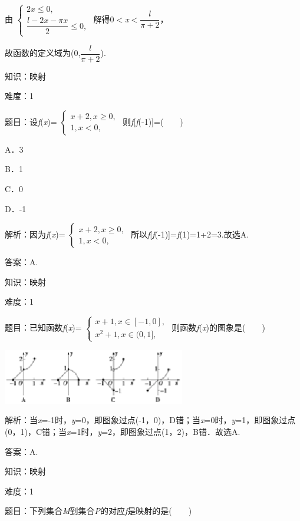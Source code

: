 \documentclass{article} %
\begin{document}
由
$\left\{
\begin{array}{l}
	2x\le 0,\\
	\dfrac{l-2x-\pi x}{2} \le 0,
\end{array}
\right.$
解得0$\mathrm{<}$\textit{x}$\mathrm{<}$$\dfrac{l}{\pi+2}$，

故函数的定义域为(0,$\dfrac{l}{\pi+2}$).

知识：映射

难度：1

题目：设\textit{f}(\textit{x})=
$\left\{
\begin{array}{l}
	x+2, x\ge 0,\\
	1, x< 0,
\end{array}
\right.$
则\textit{f}[\textit{f}(-1)]=(　　)

A．3　　　　

B．1　　　　

C．0　　　　

D．-1

解析：因为\textit{f}(\textit{x})=
$\left\{
\begin{array}{l}
x+2, x\ge 0,\\
1, x< 0,
\end{array}
\right.$
所以\textit{f}[\textit{f}(-1)]=\textit{f}(1)=1+2=3.故选A.

答案：A.

知识：映射

难度：1

题目：已知函数\textit{f}(\textit{x})=
$\left\{
\begin{array}{l}
	x+1, x\in [-1,0],\\
	x^{2}+1, x\in (0,1],
\end{array}
\right.$
则函数\textit{f}(\textit{x})的图象是(　　)

\includegraphics*[width=3.15in, height=0.95in, keepaspectratio=false]{image31}

解析：当\textit{x}=-1时，\textit{y}=0，即图象过点(-1，0)，D错；当\textit{x}=0时，\textit{y}=1，即图象过点(0，1)，C错；当\textit{x}=1时，\textit{y}=2，即图象过点(1，2)，B错．故选A.

答案：A.

知识：映射

难度：1

题目：下列集合\textit{M}到集合\textit{P}的对应\textit{f}是映射的是(　　)
\end{document}
